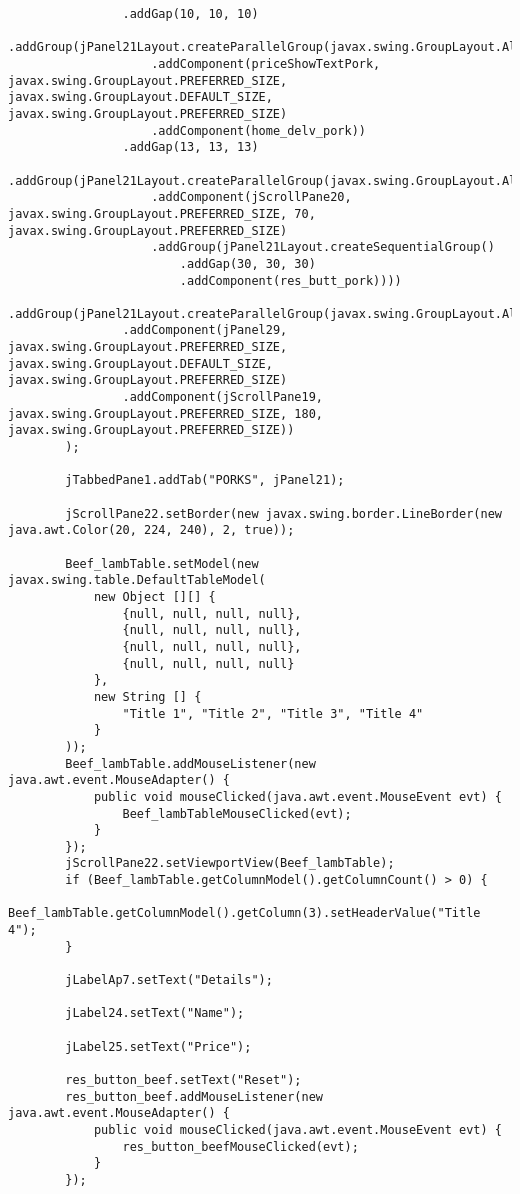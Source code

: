 \documentclass[12pt,a4paper]{article}
\begin{document}
\begin{lstlisting}
                .addGap(10, 10, 10)
                .addGroup(jPanel21Layout.createParallelGroup(javax.swing.GroupLayout.Alignment.LEADING)
                    .addComponent(priceShowTextPork, javax.swing.GroupLayout.PREFERRED_SIZE, javax.swing.GroupLayout.DEFAULT_SIZE, javax.swing.GroupLayout.PREFERRED_SIZE)
                    .addComponent(home_delv_pork))
                .addGap(13, 13, 13)
                .addGroup(jPanel21Layout.createParallelGroup(javax.swing.GroupLayout.Alignment.LEADING)
                    .addComponent(jScrollPane20, javax.swing.GroupLayout.PREFERRED_SIZE, 70, javax.swing.GroupLayout.PREFERRED_SIZE)
                    .addGroup(jPanel21Layout.createSequentialGroup()
                        .addGap(30, 30, 30)
                        .addComponent(res_butt_pork))))
            .addGroup(jPanel21Layout.createParallelGroup(javax.swing.GroupLayout.Alignment.TRAILING)
                .addComponent(jPanel29, javax.swing.GroupLayout.PREFERRED_SIZE, javax.swing.GroupLayout.DEFAULT_SIZE, javax.swing.GroupLayout.PREFERRED_SIZE)
                .addComponent(jScrollPane19, javax.swing.GroupLayout.PREFERRED_SIZE, 180, javax.swing.GroupLayout.PREFERRED_SIZE))
        );

        jTabbedPane1.addTab("PORKS", jPanel21);

        jScrollPane22.setBorder(new javax.swing.border.LineBorder(new java.awt.Color(20, 224, 240), 2, true));

        Beef_lambTable.setModel(new javax.swing.table.DefaultTableModel(
            new Object [][] {
                {null, null, null, null},
                {null, null, null, null},
                {null, null, null, null},
                {null, null, null, null}
            },
            new String [] {
                "Title 1", "Title 2", "Title 3", "Title 4"
            }
        ));
        Beef_lambTable.addMouseListener(new java.awt.event.MouseAdapter() {
            public void mouseClicked(java.awt.event.MouseEvent evt) {
                Beef_lambTableMouseClicked(evt);
            }
        });
        jScrollPane22.setViewportView(Beef_lambTable);
        if (Beef_lambTable.getColumnModel().getColumnCount() > 0) {
            Beef_lambTable.getColumnModel().getColumn(3).setHeaderValue("Title 4");
        }

        jLabelAp7.setText("Details");

        jLabel24.setText("Name");

        jLabel25.setText("Price");

        res_button_beef.setText("Reset");
        res_button_beef.addMouseListener(new java.awt.event.MouseAdapter() {
            public void mouseClicked(java.awt.event.MouseEvent evt) {
                res_button_beefMouseClicked(evt);
            }
        });


\end{lstlisting}
\end{document}
